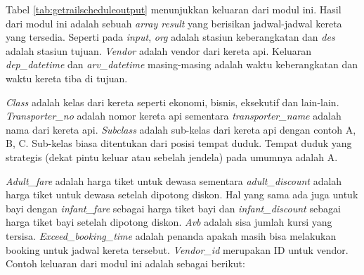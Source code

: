 Tabel \ref{tab:getrailscheduleoutput} menunjukkan keluaran dari modul ini. Hasil dari modul ini adalah sebuah \textit{array result} yang berisikan jadwal-jadwal kereta yang tersedia. Seperti pada \textit{input}, \textit{org} adalah stasiun keberangkatan dan \textit{des} adalah stasiun tujuan. \textit{Vendor} adalah vendor dari kereta api. Keluaran \textit{dep\_datetime} dan \textit{arv\_datetime} masing-masing adalah waktu keberangkatan dan waktu kereta tiba di tujuan. 

\textit{Class} adalah kelas dari kereta seperti ekonomi, bisnis, eksekutif dan lain-lain. \textit{Transporter\_no} adalah nomor kereta api sementara \textit{transporter\_name} adalah nama dari kereta api. \textit{Subclass} adalah sub-kelas dari kereta api dengan contoh A, B, C. Sub-kelas biasa ditentukan dari posisi tempat duduk. Tempat duduk yang strategis (dekat pintu keluar atau sebelah jendela) pada umumnya adalah A. 

\textit{Adult\_fare} adalah harga tiket untuk dewasa sementara \textit{adult\_discount} adalah harga tiket untuk dewasa setelah dipotong diskon. Hal yang sama ada juga untuk bayi dengan \textit{infant\_fare} sebagai harga tiket bayi dan \textit{infant\_discount} sebagai harga tiket bayi setelah dipotong diskon. \textit{Avb} adalah sisa jumlah kursi yang tersisa. \textit{Exceed\_booking\_time} adalah penanda apakah masih bisa melakukan booking untuk jadwal kereta tersebut. \textit{Vendor\_id} merupakan ID untuk vendor.\\

Contoh keluaran dari modul ini adalah sebagai berikut:

